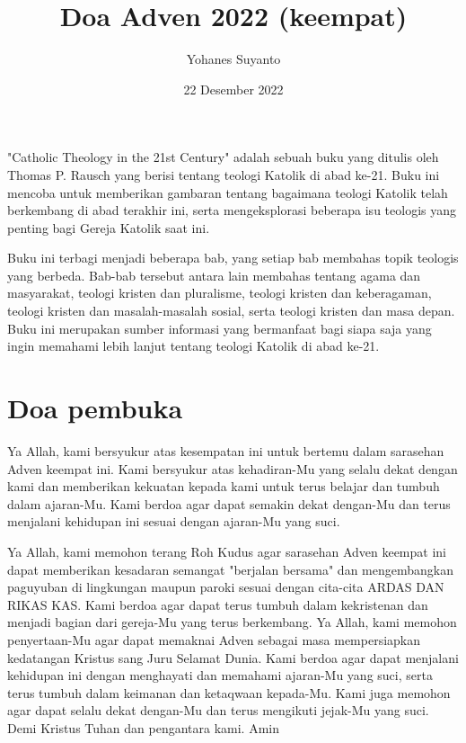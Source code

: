 \documentclass[11pt,a5paper]{article}
\author{Yohanes Suyanto}
\date{22 Desember 2022}
\title{Doa Adven 2022 (keempat)}
\begin{document}
\maketitle
"Catholic Theology in the 21st Century" adalah sebuah buku yang ditulis oleh Thomas P. Rausch yang berisi tentang teologi Katolik di abad ke-21. Buku ini mencoba untuk memberikan gambaran tentang bagaimana teologi Katolik telah berkembang di abad terakhir ini, serta mengeksplorasi beberapa isu teologis yang penting bagi Gereja Katolik saat ini.

Buku ini terbagi menjadi beberapa bab, yang setiap bab membahas topik teologis yang berbeda. Bab-bab tersebut antara lain membahas tentang agama dan masyarakat, teologi kristen dan pluralisme, teologi kristen dan keberagaman, teologi kristen dan masalah-masalah sosial, serta teologi kristen dan masa depan. Buku ini merupakan sumber informasi yang bermanfaat bagi siapa saja yang ingin memahami lebih lanjut tentang teologi Katolik di abad ke-21.


\section*{Doa pembuka}
Ya Allah, kami bersyukur atas kesempatan ini untuk bertemu dalam sarasehan Adven keempat ini. Kami bersyukur atas kehadiran-Mu yang selalu dekat dengan kami dan memberikan kekuatan kepada kami untuk terus belajar dan tumbuh dalam ajaran-Mu. Kami berdoa agar dapat semakin dekat dengan-Mu dan terus menjalani kehidupan ini sesuai dengan ajaran-Mu yang suci.

Ya Allah, kami memohon terang Roh Kudus agar sarasehan Adven keempat ini dapat memberikan kesadaran semangat "berjalan bersama" dan mengembangkan paguyuban di lingkungan maupun paroki sesuai dengan cita-cita ARDAS DAN RIKAS KAS. Kami berdoa agar dapat terus tumbuh dalam kekristenan dan menjadi bagian dari gereja-Mu yang terus berkembang. Ya Allah, kami memohon penyertaan-Mu agar dapat memaknai Adven sebagai masa mempersiapkan kedatangan Kristus sang Juru Selamat Dunia. Kami berdoa agar dapat menjalani kehidupan ini dengan menghayati dan memahami ajaran-Mu yang suci, serta terus tumbuh dalam keimanan dan ketaqwaan kepada-Mu. Kami juga memohon agar dapat selalu dekat dengan-Mu dan terus mengikuti jejak-Mu yang suci. Demi Kristus Tuhan dan pengantara kami. Amin
 
\end{document}
